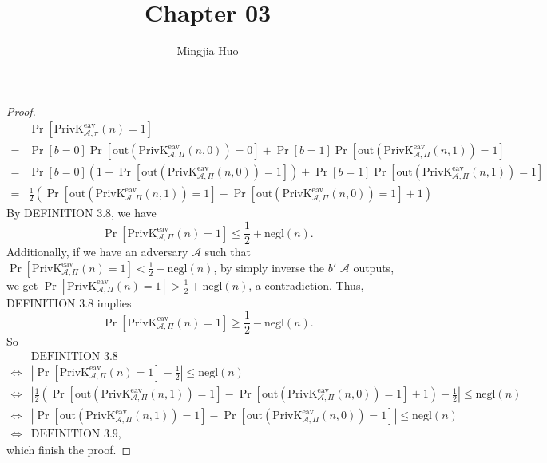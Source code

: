\documentclass[12pt]{article}
\newcommand{\privk}{\text{PrivK}}
\newcommand{\eav}{\text{eav}}
\newcommand{\out}{\text{out}}
\newcommand{\negl}{\text{negl}}
\newcommand{\A}{\mathcal{A}}
\newenvironment{problem}[2][Problem]{\begin{trivlist}
\item[\hskip \labelsep {\bfseries #1}\hskip \labelsep {\bfseries #2.}]}{\end{trivlist}}
\begin{document}
 
 
\title{Chapter 03}
\author{Mingjia Huo}
\date{}
\maketitle

\begin{problem}{3.4}
\begin{proof}
\begin{align*}
    &\Pr[\privk_{\A,\pi}^{\eav}(n)=1]\\
    =&\Pr[b=0]\Pr[\out(\privk_{\A,\Pi}^{\eav}(n,0))=0]+\Pr[b=1]\Pr[\out(\privk_{\A,\Pi}^{\eav}(n,1))=1]\\
    =&\Pr[b=0](1-\Pr[\out(\privk_{\A,\Pi}^{\eav}(n,0))=1])+\Pr[b=1]\Pr[\out(\privk_{\A,\Pi}^{\eav}(n,1))=1]\\
    =&\frac12(\Pr[\out(\privk_{\A,\Pi}^{\eav}(n,1))=1]-\Pr[\out(\privk_{\A,\Pi}^{\eav}(n,0))=1]+1)
\end{align*}
By DEFINITION 3.8, we have
\[ \Pr[\privk_{\A,\Pi}^{\eav}(n)=1]\le\frac12+\negl(n). \]
Additionally, if we have an adversary $\A$ such that $\Pr[\privk_{\A,\Pi}^{\eav}(n)=1]<\frac12-\negl(n)$, by simply inverse the $b'$ $\A$ outputs, we get $\Pr[\privk_{\A,\Pi}^{\eav}(n)=1]>\frac12+\negl(n)$, a contradiction. Thus, DEFINITION 3.8 implies 
$$\Pr[\privk_{\A,\Pi}^{\eav}(n)=1]\ge\frac12-\negl(n).$$
So 
\begin{align*}
    &\text{DEFINITION 3.8}\\
    \Leftrightarrow&\left|\Pr[\privk_{\A,\Pi}^{\eav}(n)=1]-\frac12\right|\le\negl(n)\\
    \Leftrightarrow&\left|\frac12\left(\Pr[\out(\privk_{\A,\Pi}^{\eav}(n,1))=1]-\Pr[\out(\privk_{\A,\Pi}^{\eav}(n,0))=1]+1\right)-\frac12\right|\le\negl(n)\\
    \Leftrightarrow&\left|\Pr[\out(\privk_{\A,\Pi}^{\eav}(n,1))=1]-\Pr[\out(\privk_{\A,\Pi}^{\eav}(n,0))=1]\right|\le\negl(n)\\
    \Leftrightarrow&\text{DEFINITION 3.9},
\end{align*}
which finish the proof.
\end{proof}
\end{problem}
\end{document}
